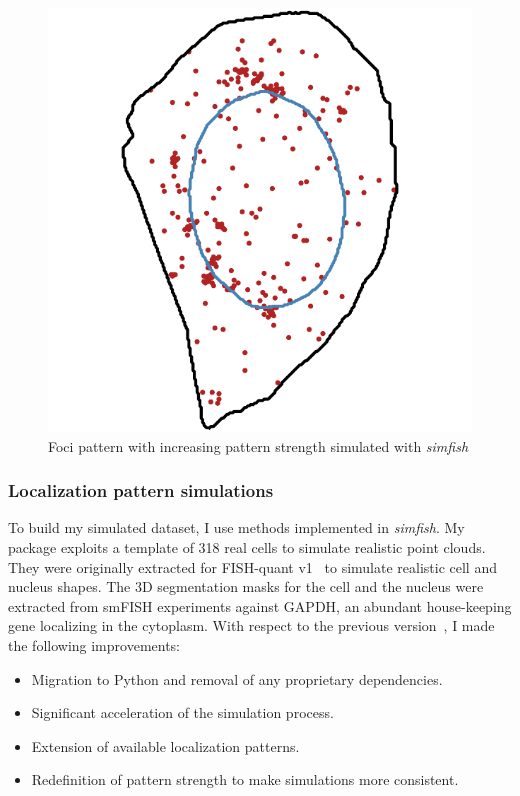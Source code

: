 \begin{figure}[]
	\endminipage\hfill
		\includegraphics[width=\linewidth]{figures/chapter4/simulation_foci_90}
	\endminipage
	\caption[Simulated foci patterns]{Foci pattern with increasing pattern strength simulated with \emph{simfish}}
	\label{fig:foci_panel}
\end{figure}

\subsubsection{Localization pattern simulations}

To build my simulated dataset, I use methods implemented in \emph{simfish}.
My package exploits a template of 318 real cells to simulate realistic point clouds.
They were originally extracted for FISH-quant v1~\cite{samacoits_computational_2018} to simulate realistic cell and nucleus shapes.
The 3D segmentation masks for the cell and the nucleus were extracted from smFISH experiments against GAPDH, an abundant house-keeping gene localizing in the cytoplasm.
With respect to the previous version~\cite{samacoits_computational_2018}, I made the following improvements:

\begin{itemize}
	\setlength\itemsep{0.1em}
	\item Migration to Python and removal of any proprietary dependencies.
	\item Significant acceleration of the simulation process.
	\item Extension of available localization patterns.
	\item Redefinition of pattern strength to make simulations more consistent.
\end{itemize}


